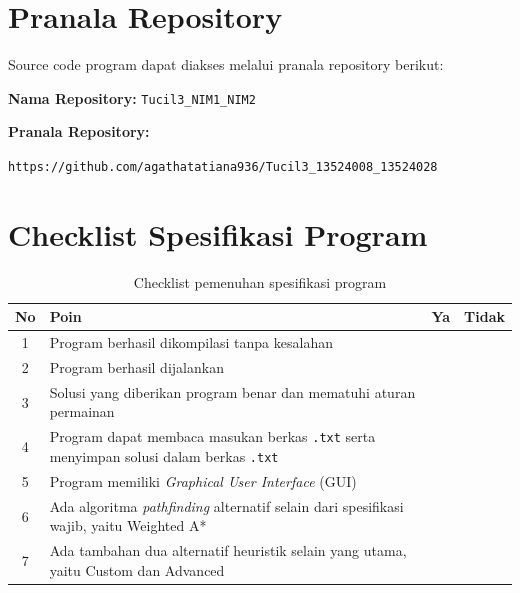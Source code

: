\section{Pranala Repository}

Source code program dapat diakses melalui pranala repository berikut:

\begin{tcolorbox}[
	colback=blue!5,
	colframe=blue!60!black,
	title=\textbf{Repository Program},
	arc=2mm,
	boxrule=0.8pt
]
\noindent
\textbf{Nama Repository:} \texttt{Tucil3\_NIM1\_NIM2}

\vspace{0.2cm}

\noindent
\textbf{Pranala Repository:}

\begin{center}
	\texttt{https://github.com/agathatatiana936/Tucil3\_13524008\_13524028}
\end{center}
\end{tcolorbox}

\section{Checklist Spesifikasi Program}

\begin{table}[H]
	\centering
	\caption{Checklist pemenuhan spesifikasi program}
	\renewcommand{\arraystretch}{1.4}
	\begin{tabular}{|c|p{9cm}|c|c|}
		\hline
		\rowcolor{gray!20}
		\textbf{No} & \centering\arraybackslash\textbf{Poin} & \textbf{Ya} & \textbf{Tidak} \\
		\hline
		1 & Program berhasil dikompilasi tanpa kesalahan & \checkmark & \\
		\hline
		2 & Program berhasil dijalankan & \checkmark & \\
		\hline
		3 & Solusi yang diberikan program benar dan mematuhi aturan permainan & \checkmark & \\
		\hline
		4 & Program dapat membaca masukan berkas \texttt{.txt} serta menyimpan solusi dalam berkas \texttt{.txt} & \checkmark & \\
		\hline
		5 & Program memiliki \textit{Graphical User Interface} (GUI) & \checkmark & \\
		\hline
		6 & Ada algoritma \textit{pathfinding} alternatif selain dari spesifikasi wajib, yaitu Weighted A* & \checkmark & \\
		\hline
		7 & Ada tambahan dua alternatif heuristik selain yang utama, yaitu Custom dan Advanced & \checkmark & \\
		\hline
	\end{tabular}
\end{table}


